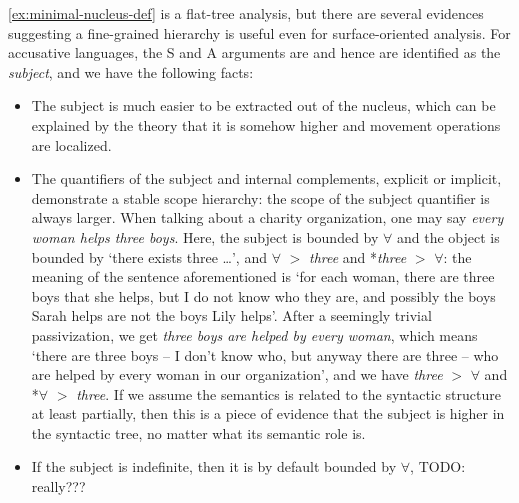\documentclass{article}
\newcommand*{\term}[1]{\emph{#1}}
\newcommand*{\corpus}[1]{\emph{#1}}
\begin{document}
\eqref{ex:minimal-nucleus-def} is a flat-tree analysis, 
but there are several evidences suggesting 
a fine-grained hierarchy is useful even for surface-oriented analysis.
For accusative languages, 
the S and A arguments are and hence are identified as the \term{subject}, 
and we have the following facts:
\begin{itemize}
    \item The subject is much easier to be extracted out of the nucleus,
    which can be explained by the theory that 
    it is somehow higher and movement operations are localized.
    \item The quantifiers of the subject and internal complements, 
    explicit or implicit, 
    demonstrate a stable scope hierarchy:
    the scope of the subject quantifier is always larger.
    When talking about a charity organization,
    one may say \corpus{every woman helps three boys}.
    Here, the subject is bounded by $\forall$ and the object is bounded by `there exists three \dots',
    and $\forall$ $>$ \corpus{three} and *\corpus{three} $>$ $\forall$:
    the meaning of the sentence aforementioned is 
    `for each woman, there are three boys that she helps,
    but I do not know who they are,
    and possibly the boys Sarah helps are not the boys Lily helps'.
    After a seemingly trivial passivization, 
    we get \corpus{three boys are helped by every woman},
    which means 
    `there are three boys -- I don't know who, but anyway there are three -- 
    who are helped by every woman in our organization',
    and we have \corpus{three} $>$ $\forall$ and *$\forall$ $>$ \corpus{three}.
    If we assume the semantics is related to the syntactic structure at least partially,
    then this is a piece of evidence that the subject is higher in the syntactic tree,
    no matter what its semantic role is. 
    \item If the subject is indefinite, then it is by default bounded by $\forall$, TODO: really???
    

\end{itemize}
\end{document}
